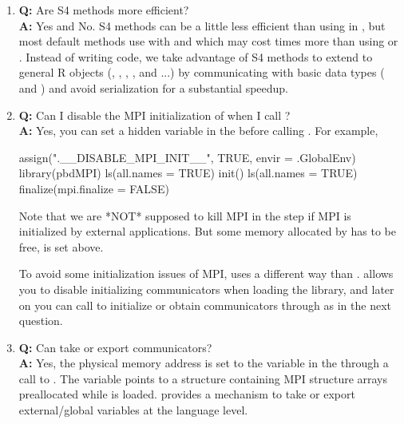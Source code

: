 \begin{enumerate}
\item {\bf\color{blue} Q:}
      Are S4 methods more efficient? \\
      {\bf\color{blue} A:}
      Yes and No. S4 methods can be a little less efficient than using
       in , but most default
      methods use  with  and 
      which may cost  times more than using
       or .
      Instead of writing  code, we take
      advantage of S4 methods to extend to general R objects (,
      , , , and  ...)
      by communicating with basic data types
      ( and ) and avoid serialization for a 
      substantial speedup.

\item {\bf\color{blue} Q:}
      Can I disable the MPI initialization of  when I call
      ? \\
      {\bf\color{blue} A:}
      Yes, you can set a hidden variable  in the
       before calling .
      For example,
\begin{Code}[title=SPMD R Script]
assign(".__DISABLE_MPI_INIT__", TRUE, envir = .GlobalEnv)
library(pbdMPI)
ls(all.names = TRUE)
init()
ls(all.names = TRUE)
finalize(mpi.finalize = FALSE)
\end{Code}
      Note that we are *NOT* supposed to kill MPI in the  step
      if MPI is initialized by external applications. But some memory allocated
      by  has to be free,  is set above.

      To avoid some initialization issues of MPI,  uses a
      different way than .  allows you to disable
      initializing communicators when loading the library, and later on you can
      call  to initialize or obtain communicators through
       as in the next question.

\item {\bf\color{blue} Q:}
      Can  take or export communicators? \\
      {\bf\color{blue} A:}
      Yes, the physical memory address is set to the variable
       in the  through a call to
      . The variable points to a structure containing MPI
      structure arrays preallocated while  is loaded.
       provides a mechanism to take or export
      external/global variables at the  language level.

\end{enumerate}




